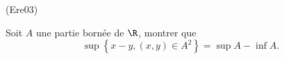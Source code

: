 \begin{tiny}(Ere03)\end{tiny} Soit $A$ une partie born{\'e}e de $\R$, montrer que
\[
\sup \left\{ x-y ,(x,y)\in A^{2}\right\} =\sup
A-\inf A.
\]